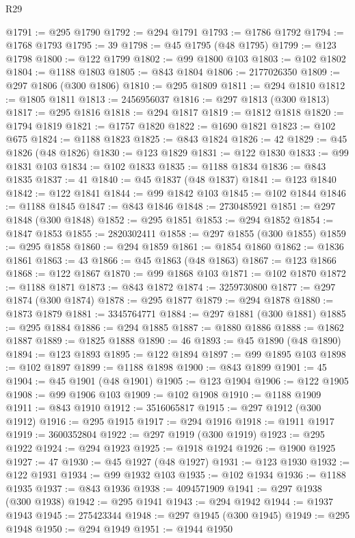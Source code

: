\begin{lexlean}{R29}
\begin{coremodule}
@1791 := @295 @1790
@1792 := @294 @1791
@1793 := @1786 @1792
@1794 := @1768 @1793
@1795 := 39
@1798 := @45 @1795 (@48 @1795)
@1799 := @123 @1798
@1800 := @122 @1799
@1802 := @99 @1800 @103
@1803 := @102 @1802
@1804 := @1188 @1803
@1805 := @843 @1804
@1806 := 2177026350
@1809 := @297 @1806 (@300 @1806)
@1810 := @295 @1809
@1811 := @294 @1810
@1812 := @1805 @1811
@1813 := 2456956037
@1816 := @297 @1813 (@300 @1813)
@1817 := @295 @1816
@1818 := @294 @1817
@1819 := @1812 @1818
@1820 := @1794 @1819
@1821 := @1757 @1820
@1822 := @1690 @1821
@1823 := @102 @675
@1824 := @1188 @1823
@1825 := @843 @1824
@1826 := 42
@1829 := @45 @1826 (@48 @1826)
@1830 := @123 @1829
@1831 := @122 @1830
@1833 := @99 @1831 @103
@1834 := @102 @1833
@1835 := @1188 @1834
@1836 := @843 @1835
@1837 := 41
@1840 := @45 @1837 (@48 @1837)
@1841 := @123 @1840
@1842 := @122 @1841
@1844 := @99 @1842 @103
@1845 := @102 @1844
@1846 := @1188 @1845
@1847 := @843 @1846
@1848 := 2730485921
@1851 := @297 @1848 (@300 @1848)
@1852 := @295 @1851
@1853 := @294 @1852
@1854 := @1847 @1853
@1855 := 2820302411
@1858 := @297 @1855 (@300 @1855)
@1859 := @295 @1858
@1860 := @294 @1859
@1861 := @1854 @1860
@1862 := @1836 @1861
@1863 := 43
@1866 := @45 @1863 (@48 @1863)
@1867 := @123 @1866
@1868 := @122 @1867
@1870 := @99 @1868 @103
@1871 := @102 @1870
@1872 := @1188 @1871
@1873 := @843 @1872
@1874 := 3259730800
@1877 := @297 @1874 (@300 @1874)
@1878 := @295 @1877
@1879 := @294 @1878
@1880 := @1873 @1879
@1881 := 3345764771
@1884 := @297 @1881 (@300 @1881)
@1885 := @295 @1884
@1886 := @294 @1885
@1887 := @1880 @1886
@1888 := @1862 @1887
@1889 := @1825 @1888
@1890 := 46
@1893 := @45 @1890 (@48 @1890)
@1894 := @123 @1893
@1895 := @122 @1894
@1897 := @99 @1895 @103
@1898 := @102 @1897
@1899 := @1188 @1898
@1900 := @843 @1899
@1901 := 45
@1904 := @45 @1901 (@48 @1901)
@1905 := @123 @1904
@1906 := @122 @1905
@1908 := @99 @1906 @103
@1909 := @102 @1908
@1910 := @1188 @1909
@1911 := @843 @1910
@1912 := 3516065817
@1915 := @297 @1912 (@300 @1912)
@1916 := @295 @1915
@1917 := @294 @1916
@1918 := @1911 @1917
@1919 := 3600352804
@1922 := @297 @1919 (@300 @1919)
@1923 := @295 @1922
@1924 := @294 @1923
@1925 := @1918 @1924
@1926 := @1900 @1925
@1927 := 47
@1930 := @45 @1927 (@48 @1927)
@1931 := @123 @1930
@1932 := @122 @1931
@1934 := @99 @1932 @103
@1935 := @102 @1934
@1936 := @1188 @1935
@1937 := @843 @1936
@1938 := 4094571909
@1941 := @297 @1938 (@300 @1938)
@1942 := @295 @1941
@1943 := @294 @1942
@1944 := @1937 @1943
@1945 := 275423344
@1948 := @297 @1945 (@300 @1945)
@1949 := @295 @1948
@1950 := @294 @1949
@1951 := @1944 @1950

\end{coremodule}
\end{lexlean}
